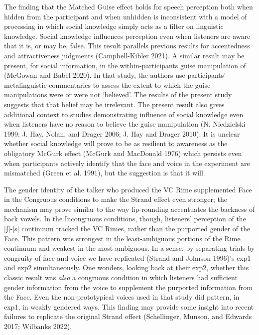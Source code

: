 \documentclass[
  letterpaper,
  DIV=11,
  numbers=noendperiod]{scrartcl}
\begin{document}
The finding that the Matched Guise effect holds for speech perception
both when hidden from the participant and when unhidden is inconsistent
with a model of processing in which social knowledge simply acts as a
filter on linguistic knowledge. Social knowledge influences perception
even when listeners are aware that it is, or may be, false. This result
parallels previous results for accentedness and attractiveness judgments
(Campbell-Kibler 2021). A similar result may be present, for social
information, in the within-participants guise manipulation of (McGowan
and Babel 2020). In that study, the authors use participants'
metalinguistic commentaries to assess the extent to which the guise
manipulations were or were not `believed'. The results of the present
study suggests that that belief may be irrelevant. The present result
also gives additional context to studies demonstrating influence of
social knowledge even when listeners have no reason to believe the guise
manipulation (N. Niedzielski 1999; J. Hay, Nolan, and Drager 2006; J.
Hay and Drager 2010). It is unclear whether social knowledge will prove
to be as resilient to awareness as the obligatory McGurk effect (McGurk
and MacDonald 1976) which persists even when participants actively
identify that the face and voice in the experiment are mismatched (Green
et al. 1991), but the suggestion is that it will.

The gender identity of the talker who produced the VC Rime supplemented
Face in the Congruous conditions to make the Strand effect even
stronger; the mechanism may prove similar to the way lip-rounding
accentuates the backness of back vowels. In the Incongruous conditions,
though, listeners' perception of the {[}ʃ{]}-{[}s{]} continuum tracked
the VC Rimes, rather than the purported gender of the Face. This pattern
was strongest in the least-ambiguous portions of the Rime continuum and
weakest in the most-ambiguous. In a sense, by separating trials by
congruity of face and voice we have replicated (Strand and Johnson
1996)'s exp1 and exp2 simultaneously. One wonders, looking back at their
exp2, whether this classic result was \emph{also} a congruous condition
in which listeners had sufficient gender information from the voice to
supplement the purported information from the Face. Even the
non-prototypical voices used in that study did pattern, in exp1, in
weakly gendered ways. This finding may provide some insight into recent
failures to replicate the original Strand effect (Schellinger, Munson,
and Edwards 2017; Wilbanks 2022).
\end{document}
